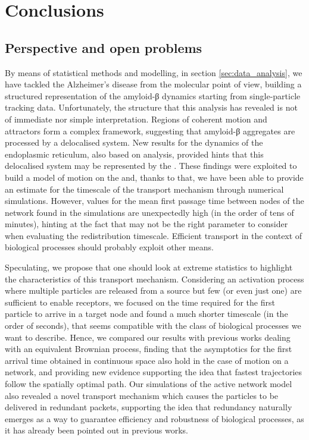 
\chapter{Conclusions}


\section{Perspective and open problems}

By means of statistical methods and modelling, in section \ref{sec:data_analysis}, we have tackled the Alzheimer's disease from the molecular point of view, building a structured representation of the amyloid-β dynamics starting from single-particle tracking data.
Unfortunately, the structure that this analysis has revealed is not of immediate nor simple interpretation.
Regions of coherent motion and attractors form a complex framework, suggesting that amyloid-β aggregates are processed by a delocalised system.
New results for the dynamics of the endoplasmic reticulum, also based on  analysis, provided hints that this delocalised system may be represented by the .
These findings were exploited to build a model of motion on the  and, thanks to that, we have been able to provide an estimate for the timescale of the  transport mechanism through numerical simulations.
However, values for the mean first passage time between nodes of the network found in the simulations are unexpectedly high (in the order of tens of minutes), hinting at the fact that  may not be the right parameter to consider when evaluating the redistribution timescale. Efficient transport in the context of biological processes should probably exploit other means.

Speculating, we propose that one should look at extreme statistics to highlight the characteristics of this transport mechanism.
Considering an activation process where multiple particles are released from a source but few (or even just one) are sufficient to enable receptors, we focused on the time required for the first particle to arrive in a target node and found a much shorter timescale (in the order of seconds), that seems compatible with the class of biological processes we want to describe.
Hence, we compared our results with previous works dealing with an equivalent Brownian process, finding that the asymptotics for the first arrival time obtained in continuous space also hold in the case of motion on a network, and providing new evidence supporting the idea that fastest trajectories follow the spatially optimal path.
Our simulations of the active network model also revealed a novel transport mechanism which causes the particles to be delivered in redundant packets, supporting the idea that redundancy naturally emerges as a way to guarantee efficiency and robustness of biological processes, as it has already been pointed out in previous works.

